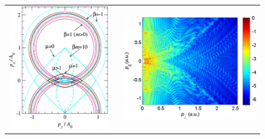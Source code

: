 \newlength{\figuresixMheight}
\setlength{\figuresixMheight}{6cm}
\begin{figure}[htb]
  \centering
  \subfloat{\label{f6-becker-circles-original-figure-a}}
  \subfloat{\label{f6-becker-circles-original-figure-b}}
  \begin{tabular}{ccc}
  \includegraphics[height=\figuresixMheight]{6-LES/Figures/figure6Ma.jpg}
  & & 
  \includegraphics[height=\figuresixMheight]{6-LES/Figures/figure6Mb.jpg}

\end{tabular}
\end{figure}
